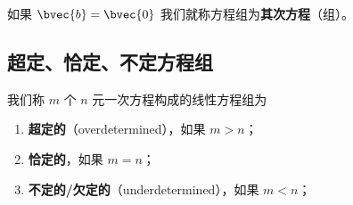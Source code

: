 如果 $\bvec{b} = \bvec{0}$ 我们就称方程组为\textbf{其次方程}（组）。

\subsection{超定、恰定、不定方程组}

我们称 $m$ 个 $n$ 元一次方程构成的线性方程组为
\begin{enumerate}
\item \textbf{超定的}（overdetermined），如果 $m > n$；
\item \textbf{恰定的}，如果 $m = n$；
\item \textbf{不定的/欠定的}（underdetermined），如果 $m < n$；
\end{enumerate}



